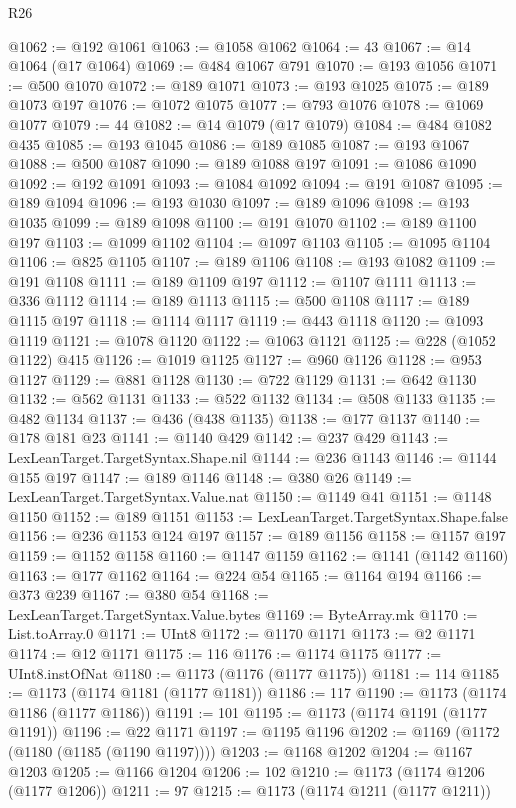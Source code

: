 \begin{lexlean}{R26}
\begin{coremodule}
@1062 := @192 @1061
@1063 := @1058 @1062
@1064 := 43
@1067 := @14 @1064 (@17 @1064)
@1069 := @484 @1067 @791
@1070 := @193 @1056
@1071 := @500 @1070
@1072 := @189 @1071
@1073 := @193 @1025
@1075 := @189 @1073 @197
@1076 := @1072 @1075
@1077 := @793 @1076
@1078 := @1069 @1077
@1079 := 44
@1082 := @14 @1079 (@17 @1079)
@1084 := @484 @1082 @435
@1085 := @193 @1045
@1086 := @189 @1085
@1087 := @193 @1067
@1088 := @500 @1087
@1090 := @189 @1088 @197
@1091 := @1086 @1090
@1092 := @192 @1091
@1093 := @1084 @1092
@1094 := @191 @1087
@1095 := @189 @1094
@1096 := @193 @1030
@1097 := @189 @1096
@1098 := @193 @1035
@1099 := @189 @1098
@1100 := @191 @1070
@1102 := @189 @1100 @197
@1103 := @1099 @1102
@1104 := @1097 @1103
@1105 := @1095 @1104
@1106 := @825 @1105
@1107 := @189 @1106
@1108 := @193 @1082
@1109 := @191 @1108
@1111 := @189 @1109 @197
@1112 := @1107 @1111
@1113 := @336 @1112
@1114 := @189 @1113
@1115 := @500 @1108
@1117 := @189 @1115 @197
@1118 := @1114 @1117
@1119 := @443 @1118
@1120 := @1093 @1119
@1121 := @1078 @1120
@1122 := @1063 @1121
@1125 := @228 (@1052 @1122) @415
@1126 := @1019 @1125
@1127 := @960 @1126
@1128 := @953 @1127
@1129 := @881 @1128
@1130 := @722 @1129
@1131 := @642 @1130
@1132 := @562 @1131
@1133 := @522 @1132
@1134 := @508 @1133
@1135 := @482 @1134
@1137 := @436 (@438 @1135)
@1138 := @177 @1137
@1140 := @178 @181 @23
@1141 := @1140 @429
@1142 := @237 @429
@1143 := LexLeanTarget.TargetSyntax.Shape.nil
@1144 := @236 @1143
@1146 := @1144 @155 @197
@1147 := @189 @1146
@1148 := @380 @26
@1149 := LexLeanTarget.TargetSyntax.Value.nat
@1150 := @1149 @41
@1151 := @1148 @1150
@1152 := @189 @1151
@1153 := LexLeanTarget.TargetSyntax.Shape.false
@1156 := @236 @1153 @124 @197
@1157 := @189 @1156
@1158 := @1157 @197
@1159 := @1152 @1158
@1160 := @1147 @1159
@1162 := @1141 (@1142 @1160)
@1163 := @177 @1162
@1164 := @224 @54
@1165 := @1164 @194
@1166 := @373 @239
@1167 := @380 @54
@1168 := LexLeanTarget.TargetSyntax.Value.bytes
@1169 := ByteArray.mk
@1170 := List.toArray.{0}
@1171 := UInt8
@1172 := @1170 @1171
@1173 := @2 @1171
@1174 := @12 @1171
@1175 := 116
@1176 := @1174 @1175
@1177 := UInt8.instOfNat
@1180 := @1173 (@1176 (@1177 @1175))
@1181 := 114
@1185 := @1173 (@1174 @1181 (@1177 @1181))
@1186 := 117
@1190 := @1173 (@1174 @1186 (@1177 @1186))
@1191 := 101
@1195 := @1173 (@1174 @1191 (@1177 @1191))
@1196 := @22 @1171
@1197 := @1195 @1196
@1202 := @1169 (@1172 (@1180 (@1185 (@1190 @1197))))
@1203 := @1168 @1202
@1204 := @1167 @1203
@1205 := @1166 @1204
@1206 := 102
@1210 := @1173 (@1174 @1206 (@1177 @1206))
@1211 := 97
@1215 := @1173 (@1174 @1211 (@1177 @1211))

\end{coremodule}
\end{lexlean}
